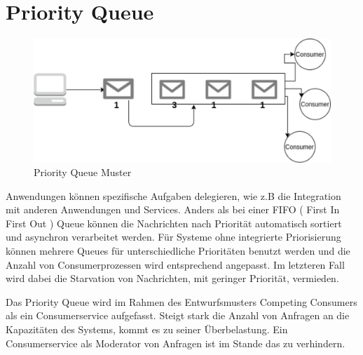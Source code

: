 \documentclass[
12pt,
english,
ngerman,
headsepline,
twoside,
openright,
numbers=noenddot,version=first
]{scrreprt}
\begin{document}
\section{Priority Queue}\label{sec:priority-queue}
\begin{figure}[H]
	\centering
	\includegraphics[scale=0.60]{./pics/pattern-priority-queue.eps}
	\caption{Priority Queue Muster}
	\label{pic:priority-queue}
\end{figure}
Anwendungen können spezifische Aufgaben delegieren, wie z.B die Integration mit anderen Anwendungen und Services. Anders als bei einer FIFO  ( First In First Out ) Queue können die Nachrichten nach Priorität automatisch sortiert und asynchron verarbeitet werden. Für Systeme ohne integrierte Priorisierung können mehrere Queues für unterschiedliche Prioritäten benutzt werden und die Anzahl von Consumerprozessen wird entsprechend angepasst. Im letzteren Fall wird dabei die Starvation von Nachrichten, mit geringer Priorität, vermieden.

Das Priority Queue wird im Rahmen des Entwurfsmusters Competing Consumers als ein Consumerservice aufgefasst. Steigt stark die Anzahl von Anfragen an die Kapazitäten des Systems, kommt es zu seiner Überbelastung. Ein Consumerservice als Moderator von Anfragen ist im Stande das zu verhindern.
\end{document}
